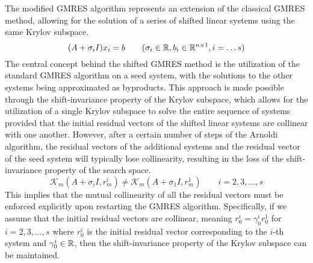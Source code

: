 \noindent The modified GMRES algorithm represents an extension of the classical GMRES method, allowing for the solution of a series of shifted linear systems using the same Krylov subspace.
\begin{equation*}
    (A + \sigma_i I)x_i = b \qquad (\sigma_i \in \mathbb{R}, b_i \in \mathbb{R}^{n\times 1}, i = \dots s) 
\end{equation*}
The central concept behind the shifted GMRES method is the utilization of the standard GMRES algorithm on a seed system, with the solutions to the other systems being approximated as byproducts. This approach is made possible through the shift-invariance property of the Krylov subspace, which allows for the utilization of a single Krylov subspace to solve the entire sequence of systems provided that the initial residual vectors of the shifted linear systems are collinear with one another. However, after a certain number of steps of the Arnoldi algorithm, the residual vectors of the additional systems and the residual vector of the seed system will typically lose collinearity, resulting in the loss of the shift-invariance property of the search space.
\begin{equation*}
    \mathcal{K}_m(A + \sigma_i I, r_m^i) \neq \mathcal{K}_m(A + \sigma_1 I, r_m^1) \qquad i = 2, 3, \dots, s
\end{equation*}
This implies that the mutual collinearity of all the residual vectors must be enforced explicitly upon restarting the GMRES algorithm. Specifically, if we assume that the initial residual vectors are collinear, meaning $r_0^i = \gamma_0^i r_0^1$ for $i = 2, 3, \dots, s$ where $r_0^i$ is the initial residual vector corresponding to the $i$-th system and $\gamma_0^i \in \mathbb{R}$, then the shift-invariance property of the Krylov subspace can be maintained.

